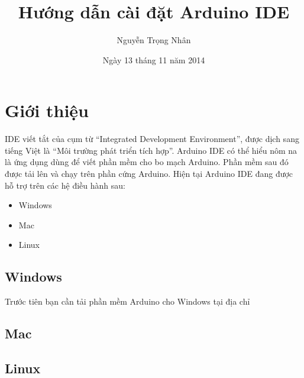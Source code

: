 \documentclass[11pt]{article} %
\title{Hướng dẫn cài đặt Arduino IDE}
\author{Nguyễn Trọng Nhân}
\date{Ngày 13 tháng 11 năm 2014}
\begin{document}
\maketitle

\section{Giới thiệu}
IDE viết tắt của cụm từ ``Integrated Development Environment'', được dịch sang tiếng Việt là ``Môi trường phát triển tích hợp''. Arduino IDE có thể hiểu nôm na là ứng dụng dùng để viết phần mềm cho bo mạch Arduino. Phần mềm sau đó được tải lên và chạy trên phần cứng Arduino.
Hiện tại Arduino IDE đang được hỗ trợ trên các hệ điều hành sau:
\begin{itemize}
\item Windows
\item Mac
\item Linux
\end{itemize}

\subsection{Windows}
Trước tiên bạn cần tải phần mềm Arduino cho Windows tại địa chỉ 

\subsection{Mac}


\subsection{Linux}
\end{document}
